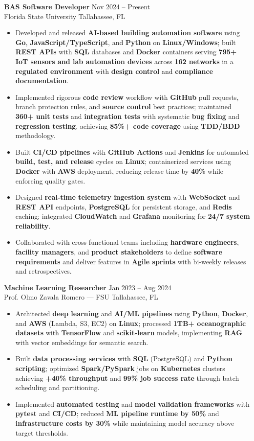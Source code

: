 \documentclass[letterpaper,10pt]{article}
\newcommand{\resumeItem}[1]{\item\small #1}
\newcommand{\resumeSubheading}[4]{
  \vspace{6pt}
  \noindent
  \textbf{#1} \hfill {\footnotesize #2} \\
  [-1pt]
  \noindent
  \small #3 \hfill {\small #4}
  \vspace{3pt}
}
\newcommand{\resumeItemsStart}{\vspace{-2pt}\begin{itemize}}
\newcommand{\resumeItemsEnd}{\end{itemize}\vspace{6pt}}
\begin{document}
\resumeSubheading
{BAS Software Developer}{Nov 2024 -- Present}
{Florida State University}{Tallahassee, FL}
\resumeItemsStart
\resumeItem{Developed and released \textbf{AI-based building automation software} using \textbf{Go}, \textbf{JavaScript/TypeScript}, and \textbf{Python} on \textbf{Linux/Windows}; built \textbf{REST APIs} with \textbf{SQL} databases and \textbf{Docker} containers serving \textbf{795+ IoT sensors and lab automation devices} across \textbf{162 networks} in a \textbf{regulated environment} with \textbf{design control} and \textbf{compliance documentation}.}
\resumeItem{Implemented rigorous \textbf{code review} workflow with \textbf{GitHub} pull requests, branch protection rules, and \textbf{source control} best practices; maintained \textbf{360+ unit tests} and \textbf{integration tests} with systematic \textbf{bug fixing} and \textbf{regression testing}, achieving \textbf{85\%+ code coverage} using \textbf{TDD/BDD} methodology.}
\resumeItem{Built \textbf{CI/CD pipelines} with \textbf{GitHub Actions} and \textbf{Jenkins} for automated \textbf{build, test, and release} cycles on \textbf{Linux}; containerized services using \textbf{Docker} with \textbf{AWS} deployment, reducing release time by \textbf{40\%} while enforcing quality gates.}
\resumeItem{Designed \textbf{real-time telemetry ingestion system} with \textbf{WebSocket} and \textbf{REST API} endpoints, \textbf{PostgreSQL} for persistent storage, and \textbf{Redis} caching; integrated \textbf{CloudWatch} and \textbf{Grafana} monitoring for \textbf{24/7 system reliability}.}
\resumeItem{Collaborated with cross-functional teams including \textbf{hardware engineers}, \textbf{facility managers}, and \textbf{product stakeholders} to define \textbf{software requirements} and deliver features in \textbf{Agile sprints} with bi-weekly releases and retrospectives.}
\resumeItemsEnd
\vspace{-12pt}

\resumeSubheading
{Machine Learning Researcher}{Jan 2023 -- Aug 2024}
{Prof. Olmo Zavala Romero --- FSU}{Tallahassee, FL}
\resumeItemsStart
\resumeItem{Architected \textbf{deep learning} and \textbf{AI/ML pipelines} using \textbf{Python}, \textbf{Docker}, and \textbf{AWS} (Lambda, S3, EC2) on \textbf{Linux}; processed \textbf{1TB+ oceanographic datasets} with \textbf{TensorFlow} and \textbf{scikit-learn} models, implementing \textbf{RAG} with vector embeddings for semantic search.}
\resumeItem{Built \textbf{data processing services} with \textbf{SQL} (PostgreSQL) and \textbf{Python scripting}; optimized \textbf{Spark/PySpark} jobs on \textbf{Kubernetes} clusters achieving \textbf{+40\% throughput} and \textbf{99\% job success rate} through batch scheduling and partitioning.}
\resumeItem{Implemented \textbf{automated testing} and \textbf{model validation frameworks} with \textbf{pytest} and \textbf{CI/CD}; reduced \textbf{ML pipeline runtime by 50\%} and \textbf{infrastructure costs by 30\%} while maintaining model accuracy above target thresholds.}
\resumeItemsEnd
\vspace{-12pt}
\end{document}
